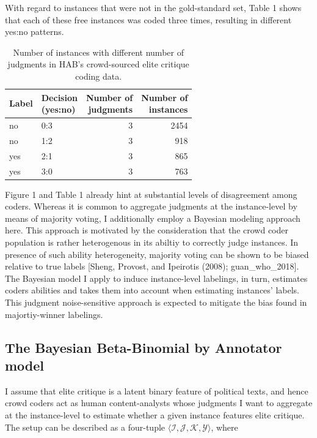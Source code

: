 \documentclass[12pt,]{article}
\begin{document}
With regard to instances that were not in the gold-standard set, Table 1
shows that each of these free instances was coded three times, resulting
in different yes:no patterns.

\begin{table}[!h]

\caption{\label{tab:inspect validation data}Number of instances with different number of judgments in HAB's crowd-sourced elite critique coding data.}
\centering
\begin{tabular}{llrr}
\toprule
Label & \makecell[c]{Decision\\(yes:no)} & \makecell[c]{Number of\\judgments} & \makecell[c]{Number of\\instances}\\
\midrule
no & 0:3 & 3 & 2454\\
no & 1:2 & 3 & 918\\
yes & 2:1 & 3 & 865\\
yes & 3:0 & 3 & 763\\
\bottomrule
\end{tabular}
\end{table}

Figure 1 and Table 1 already hint at substantial levels of disagreement
among coders. Whereas it is common to aggregate judgments at the
instance-level by means of majority voting, I additionally employ a
Bayesian modeling approach here. This approach is motivated by the
consideration that the crowd coder population is rather heterogenous in
its abiltiy to correctly judge instances. In presence of such ability
heterogeneity, majority voting can be shown to be biased relative to
true labels {[}Sheng, Provost, and Ipeirotis (2008); guan\_who\_2018{]}.
The Bayesian model I apply to induce instance-level labelings, in turn,
estimates coders abilities and takes them into account when estimating
instances' labels. This judgment noise-sensitive approach is expected to
mitigate the bias found in majortiy-winner labelings.

\hypertarget{the-bayesian-beta-binomial-by-annotator-model}{%
\subsection{The Bayesian Beta-Binomial by Annotator
model}\label{the-bayesian-beta-binomial-by-annotator-model}}

I assume that elite critique is a latent binary feature of political
texts, and hence crowd coders act as human content-analysts whose
judgments I want to aggregate at the instance-level to estimate whether
a given instance features elite critique. The setup can be described as
a four-tuple
\(\langle\mathcal{I}, \mathcal{J}, \mathcal{K}, \mathcal{Y}\rangle\),
where
\end{document}
